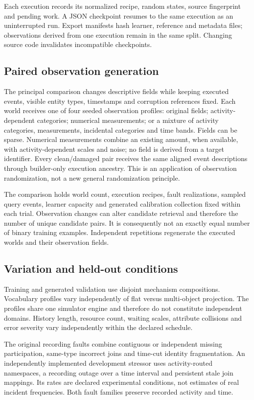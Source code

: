 \documentclass[11pt]{article}
\begin{document}
Each execution records its normalized recipe, random states, source fingerprint and pending work. A JSON checkpoint resumes to the same execution as an uninterrupted run. Export manifests hash learner, reference and metadata files; observations derived from one execution remain in the same split. Changing source code invalidates incompatible checkpoints.

\subsection{Paired observation generation}
The principal comparison changes descriptive fields while keeping executed events, visible entity types, timestamps and corruption references fixed. Each world receives one of four seeded observation profiles: original fields; activity-dependent categories; numerical measurements; or a mixture of activity categories, measurements, incidental categories and time bands. Fields can be sparse. Numerical measurements combine an existing amount, when available, with activity-dependent scales and noise; no field is derived from a target identifier. Every clean/damaged pair receives the same aligned event descriptions through builder-only execution ancestry. This is an application of observation randomization, not a new general randomization principle.

The comparison holds world count, execution recipes, fault realizations, sampled query events, learner capacity and generated calibration collection fixed within each trial. Observation changes can alter candidate retrieval and therefore the number of unique candidate pairs. It is consequently not an exactly equal number of binary training examples. Independent repetitions regenerate the executed worlds and their observation fields.

\subsection{Variation and held-out conditions}
Training and generated validation use disjoint mechanism compositions. Vocabulary profiles vary independently of flat versus multi-object projection. The profiles share one simulator engine and therefore do not constitute independent domains. History length, resource count, waiting scales, attribute collisions and error severity vary independently within the declared schedule.

The original recording faults combine contiguous or independent missing participation, same-type incorrect joins and time-cut identity fragmentation. An independently implemented development stressor uses activity-routed namespaces, a recording outage over a time interval and persistent stale join mappings. Its rates are declared experimental conditions, not estimates of real incident frequencies. Both fault families preserve recorded activity and time.
\end{document}
